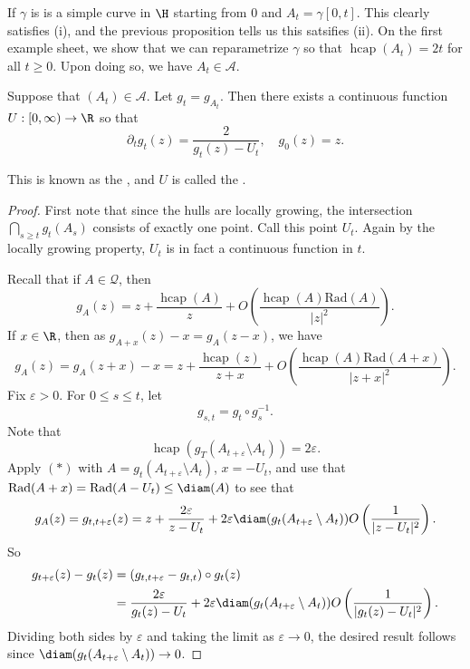\documentclass[a4paper]{article}
\DeclareMathOperator\hcap{hcap}
\newcommand\rad{\mathrm{Rad}}
\begin{document}
\begin{eg}
  If $\gamma$ is is a simple curve in $\H$ starting from $0$ and $A_t = \gamma[0, t]$. This clearly satisfies (i), and the previous proposition tells us this satsifies (ii). On the first example sheet, we show that we can reparametrize $\gamma$ so that $\hcap(A_t) = 2t$ for all $t \geq 0$. Upon doing so, we have $A_t \in \mathcal{A}$.
\end{eg}

\begin{thm} %
  Suppose that $(A_t) \in \mathcal{A}$. Let $g_t = g_{A_t}$. Then there exists a continuous function $U: [0, \infty) \to \R$ so that
  \[
    \partial_t g_t (z) = \frac{2}{g_t(z) - U_t},\quad g_0(z) = z.
  \]
\end{thm}
This is known as the , and $U$ is called the .

\begin{proof}
  First note that since the hulls are locally growing, the intersection $\bigcap_{s \geq t} g_t(A_s)$ consists of exactly one point. Call this point $U_t$. Again by the locally growing property, $U_t$ is in fact a continuous function in $t$.

  Recall that if $A \in \mathcal{Q}$, then
  \[
    g_A(z) = z + \frac{\hcap(A)}{z} + O\left(\frac{\hcap(A) \rad(A)}{|z|^2}\right).
  \]
  If $x \in \R$, then as $g_{A + x}(z) - x = g_A(z - x)$, we have
  \[
    g_A(z) = g_A(z + x) - x = z + \frac{\hcap(z)}{z + x} + O\left(\frac{\hcap(A) \rad(A + x)}{|z + x|^2}\right).\tag{$*$}
  \]
  Fix $\varepsilon > 0$. For $0 \leq s \leq t$, let
  \[
    g_{s, t} = g_t \circ g_s^{-1}.
  \]
  Note that
  \[
    \hcap(g_T(A_{t + \varepsilon} \setminus A_t)) = 2 \varepsilon.
  \]
  Apply $(*)$ with $A = g_t(A_{t + \varepsilon} \setminus A_t)$, $x = -U_t$, and use that $\rad(A + x) = \rad(A - U_t) \leq \diam(A)$ to see that
  \[
    g_A(z) = g_{t, t + \varepsilon}(z) = z + \frac{2\varepsilon}{z - U_t} + 2 \varepsilon \diam(g_t(A_{t + \varepsilon} \setminus A_t))O\left(\frac{1}{|z - U_t|^2}\right).
  \]
  So
  \begin{align*}
    g_{t + \varepsilon}(z) - g_t(z) &= (g_{t, t + \varepsilon} - g_{t, t}) \circ g_t(z)\\
    &= \frac{2\varepsilon}{g_t(z) - U_t} + 2\varepsilon \diam(g_t(A_{t + \varepsilon} \setminus A_t)) O\left(\frac{1}{|g_t(z) - U_t|^2}\right).
  \end{align*}
  Dividing both sides by $\varepsilon$ and taking the limit as $\varepsilon \to 0$, the desired result follows since $\diam(g_t(A_{t + \varepsilon} \setminus A_t)) \to 0$.
\end{proof}
\end{document}
